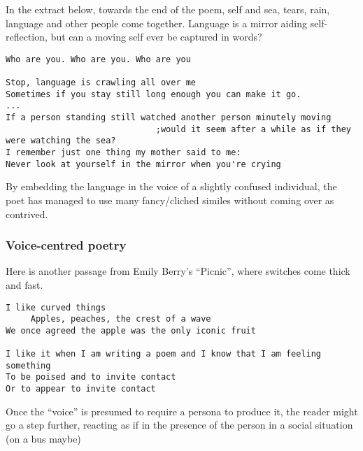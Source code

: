 \documentclass[11pt]{article}
\begin{document}
In the extract below, towards the end of the poem, self and sea,  tears, rain, language and other people come together. Language is a mirror aiding self-reflection, but can a moving self ever be captured in words? 
\begin{verbatim}
Who are you. Who are you. Who are you

Stop, language is crawling all over me
Sometimes if you stay still long enough you can make it go.
...
If a person standing still watched another person minutely moving
                              ;would it seem after a while as if they were watching the sea?
I remember just one thing my mother said to me:
Never look at yourself in the mirror when you're crying
\end{verbatim}


By embedding the language in the voice of a slightly confused individual, the poet has managed to use many fancy/cliched similes without coming over as contrived.

\subsubsection*{Voice-centred poetry}


Here is another passage from Emily Berry's ``Picnic'', where switches come thick and fast.
\begin{verbatim}
I like curved things
     Apples, peaches, the crest of a wave
We once agreed the apple was the only iconic fruit

I like it when I am writing a poem and I know that I am feeling something
To be poised and to invite contact
Or to appear to invite contact
\end{verbatim}


Once the ``voice'' is presumed to require a persona to produce it, the reader might go a step further, reacting as if in the presence of the person in a social situation (on a bus maybe)
\end{document}
